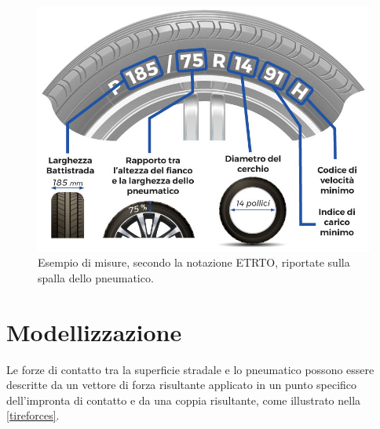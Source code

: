 \begin{figure}[h]
	\centering
	\includegraphics[width=0.7\linewidth]{Figures/tire_measures}
	\caption{Esempio di misure, secondo la notazione ETRTO, riportate sulla spalla dello pneumatico.}
	\label{tiremeasures}
\end{figure}
%
\section{Modellizzazione}
Le forze di contatto tra la superficie stradale e lo pneumatico possono essere descritte da un vettore di forza risultante applicato in un punto specifico dell'impronta di contatto e da una coppia risultante, come illustrato nella \figurename{  \ref{tireforces}}.

